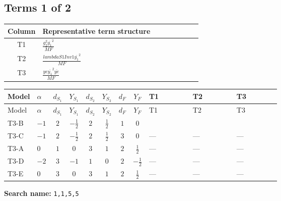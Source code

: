 \documentclass[8pt]{article}
\begin{document}
\begin{landscape}
\subsection*{Terms 1 of 2}
\begin{center}
\begin{tabular}{@{}c >{\raggedright\arraybackslash}p{0.82\linewidth}@{}}
\toprule
Column & Representative term structure \\
\midrule
T1 & \(\displaystyle \frac{g_{2}^{2} \overline{y_{1}}^{2}}{MF}\) \\
\midrule
T2 & \(\displaystyle \frac{lambdaS1Inv1 \overline{y_{1}}^{2}}{MF}\) \\
\midrule
T3 & \(\displaystyle \frac{ye \overline{y_{1}}^{2} \overline{ye}}{MF}\) \\
\midrule
\bottomrule
\end{tabular}
\end{center}
\smallskip
\tiny
\begin{longtable}{@{}llcccccc >{\raggedright\arraybackslash}p{0.21\linewidth} >{\raggedright\arraybackslash}p{0.21\linewidth} >{\raggedright\arraybackslash}p{0.21\linewidth}@{}}
\toprule
Model & $\alpha$ & $d_{S_1}$ & $Y_{S_1}$ & $d_{S_2}$ & $Y_{S_2}$ & $d_F$ & $Y_F$ & T1 & T2 & T3 \\
\midrule
\endfirsthead
\toprule
Model & $\alpha$ & $d_{S_1}$ & $Y_{S_1}$ & $d_{S_2}$ & $Y_{S_2}$ & $d_F$ & $Y_F$ & T1 & T2 & T3 \\
\midrule
\endhead
T3-B & $-1$ & $2$ & $-\frac{1}{2}$ & $2$ & $\frac{1}{2}$ & $1$ & $0$ & \scriptsize\adjustbox{max width=\linewidth}{$\begin{gathered} - \frac{3 g_{2}^{2} \overline{y_{1}}^{2}}{4 MF}\end{gathered}$} & \scriptsize\adjustbox{max width=\linewidth}{$\begin{gathered} - \frac{lambdaS1Inv1 \overline{y_{1}}^{2}}{2 MF}\end{gathered}$} & \scriptsize\adjustbox{max width=\linewidth}{$\begin{gathered} \frac{ye \overline{y_{1}}^{2} \overline{ye}}{4 MF}\end{gathered}$} \\
\midrule
T3-C & $-1$ & $2$ & $-\frac{1}{2}$ & $2$ & $\frac{1}{2}$ & $3$ & $0$ & --- & --- & --- \\
\midrule
T3-A & $0$ & $1$ & $0$ & $3$ & $1$ & $2$ & $\frac{1}{2}$ & --- & --- & --- \\
\midrule
T3-D & $-2$ & $3$ & $-1$ & $1$ & $0$ & $2$ & $-\frac{1}{2}$ & --- & --- & --- \\
\midrule
T3-E & $0$ & $3$ & $0$ & $3$ & $1$ & $2$ & $\frac{1}{2}$ & --- & --- & --- \\
\midrule
\bottomrule
\end{longtable}
\clearpage
\noindent\textbf{Search name: }\texttt{1,1,5,5}\par\smallskip

\end{landscape}
\end{document}
